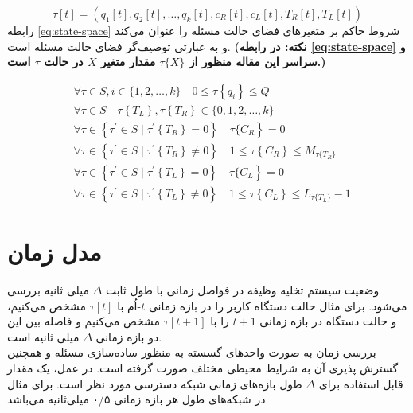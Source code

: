 \begin{equation}
	\label{eg:state}
	\tau[t]=\left(q_{1}[t], q_{2}[t], \ldots, q_{k}[t], c_{R}[t], c_{L}[t], T_{R}[t], T_{L}[t]\right)
\end{equation}
رابطه \ref{eq:state-space} شروط حاکم بر متغیرهای فضای حالت مسئله را عنوان می‌کند و به عبارتی توصیف‌گر فضای حالت مسئله است. \textbf{(نکته: در رابطه \ref{eq:state-space} و سراسر این مقاله منظور از \(\tau\{X\}\) مقدار متغیر \(X\) در حالت \(\tau\) است.)}

\begin{equation}
	\label{eq:state-space}
	\begin{aligned}
		&\forall \tau \in S, i \in \{1,2, \ldots, k\} \quad 0 \leqslant\tau\left\{q_{i}\right\} \leqslant Q\\
		&\forall \tau \in S \quad  \tau\left\{T_L\right\},  \tau\left\{T_R\right\} \in \{0, 1,2, \ldots, k\}\\
		&\left.\forall \tau \in\left\{\tau^{\prime} \in S \mid \tau^{\prime}\left\{T_{R}\right\}=0\right\} \quad \tau\{C_R\right\}=0\\
		&\forall \tau \in\left\{\tau^{\prime} \in S \mid \tau^{\prime}\left\{T_{R}\right\} \neq 0\right\} \quad 1 \leqslant \tau\left\{C_{R}\right\} \leqslant M_{\tau\{T_{R}\}} \\
		&\left.\forall \tau \in\left\{\tau^{\prime} \in S \mid \tau^{\prime}\left\{T_{L}\right\}=0\right\} \quad \tau\{C_L\right\}=0\\
		&\forall \tau \in\left\{\tau^{\prime} \in S \mid \tau^{\prime}\left\{T_{L}\right\} \neq 0\right\} \quad 1 \leqslant \tau\left\{C_{L}\right\} \leqslant L_{\tau\{T_{L}\}} - 1
	\end{aligned}
\end{equation}

\newpage
\section{مدل زمان}
وضعیت سیستم تخلیه وظیفه در فواصل زمانی با طول ثابت \(\Delta\) میلی ثانیه بررسی می‌شود. برای مثال حالت دستگاه کاربر را در بازه زمانی \(t\)-اُم با \(\tau[t]\) مشخص می‌کنیم، و حالت دستگاه در بازه زمانی \(t + 1\) را با \(\tau[t + 1]\) مشخص می‌کنیم و فاصله بین این دو بازه زمانی \(\Delta\) میلی ثانیه است. \\

بررسی زمان به صورت واحدهای گسسته به منظور ساده‌سازی مسئله و همچنین گسترش پذیری آن به شرایط محیطی مختلف صورت گرفته است. در عمل، یک مقدار قابل استفاده برای \(\Delta\) طول بازه‌های زمانی شبکه دسترسی مورد نظر است. برای مثال در شبکه‌های  طول هر بازه زمانی ۰/۵ میلی‌ثانیه می‌باشد. \cite{LTE}

